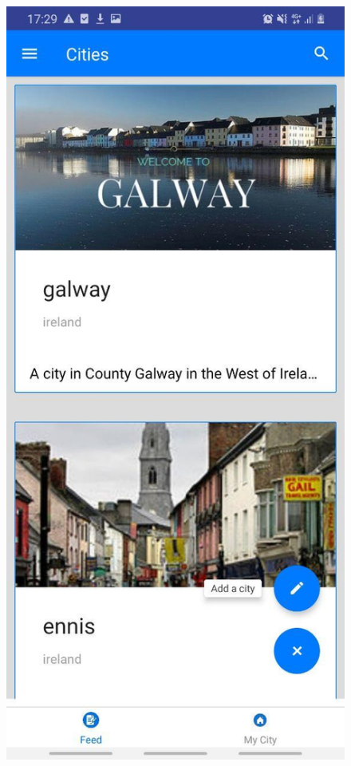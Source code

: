 
\begin{figure}[h!]
\begin{minipage}[t]{0.48\textwidth}
\includegraphics[width=\linewidth,keepaspectratio=true]{img/add_city.jpg}

\end{minipage}
\end{figure}
